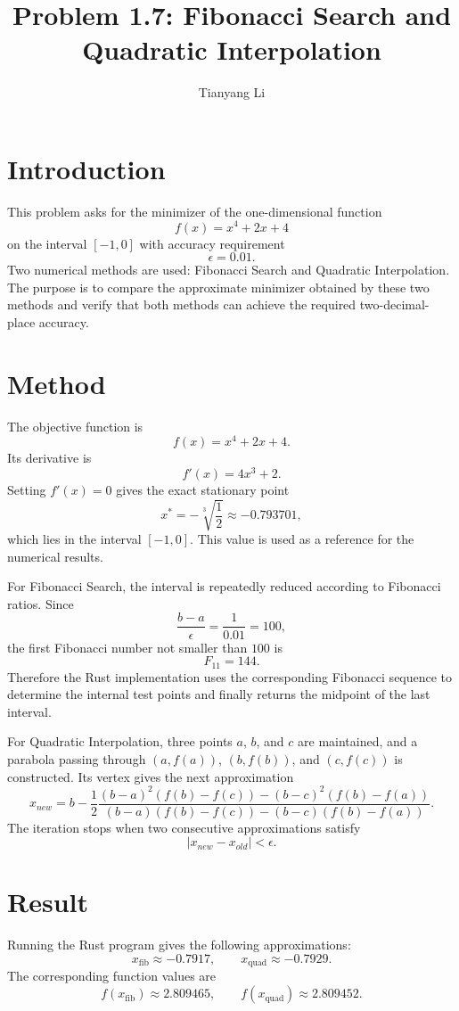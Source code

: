 \documentclass{article}
\title{Problem 1.7: Fibonacci Search and Quadratic Interpolation}
\author{Tianyang Li}
\begin{document}
\maketitle

\section{Introduction}

This problem asks for the minimizer of the one-dimensional function
\[
    f(x) = x^4 + 2x + 4
\]
on the interval $[-1,0]$ with accuracy requirement
\[
    \epsilon = 0.01.
\]
Two numerical methods are used: Fibonacci Search and Quadratic Interpolation. The purpose is to compare the approximate minimizer obtained by these two methods and verify that both methods can achieve the required two-decimal-place accuracy.

\section{Method}

The objective function is
\[
    f(x) = x^4 + 2x + 4.
\]
Its derivative is
\[
    f'(x) = 4x^3 + 2.
\]
Setting $f'(x)=0$ gives the exact stationary point
\[
    x^* = -\sqrt[3]{\frac{1}{2}} \approx -0.793701,
\]
which lies in the interval $[-1,0]$. This value is used as a reference for the numerical results.

For Fibonacci Search, the interval is repeatedly reduced according to Fibonacci ratios. Since
\[
    \frac{b-a}{\epsilon} = \frac{1}{0.01} = 100,
\]
the first Fibonacci number not smaller than $100$ is
\[
    F_{11} = 144.
\]
Therefore the Rust implementation uses the corresponding Fibonacci sequence to determine the internal test points and finally returns the midpoint of the last interval.

For Quadratic Interpolation, three points $a$, $b$, and $c$ are maintained, and a parabola passing through $(a,f(a))$, $(b,f(b))$, and $(c,f(c))$ is constructed. Its vertex gives the next approximation
\[
    x_{new} = b - \frac{1}{2}
    \frac{(b-a)^2(f(b)-f(c)) - (b-c)^2(f(b)-f(a))}{(b-a)(f(b)-f(c)) - (b-c)(f(b)-f(a))}.
\]
The iteration stops when two consecutive approximations satisfy
\[
    |x_{new} - x_{old}| < \epsilon.
\]

\section{Result}

Running the Rust program gives the following approximations:
\[
    x_{\text{fib}} \approx -0.7917,
    \qquad
    x_{\text{quad}} \approx -0.7929.
\]
The corresponding function values are
\[
    f(x_{\text{fib}}) \approx 2.809465,
    \qquad
    f(x_{\text{quad}}) \approx 2.809452.
\]
\end{document}
